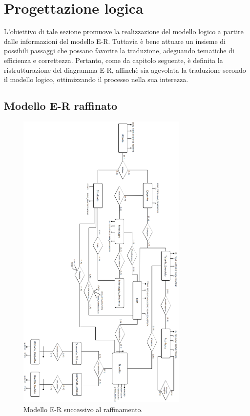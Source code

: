 \documentclass{article}
\begin{document}
\section{Progettazione logica}
\large
L'obiettivo di tale sezione promuove la realizzazione del modello logico a partire dalle informazioni del modello E-R. Tuttavia è bene attuare un insieme di possibili passaggi che possano favorire la traduzione, adeguando tematiche di efficienza e correttezza. Pertanto, come da capitolo seguente, è definita la ristrutturazione del diagramma E-R, affinchè sia agevolata la traduzione secondo il modello logico, ottimizzando il processo nella sua interezza.

\subsection{Modello E-R raffinato}
\large
\begin{figure}[H]
    \includegraphics*[width=0.75\textwidth]{foto2.png}
    \caption{Modello E-R successivo al raffinamento.}
\end{figure}
\end{document}
